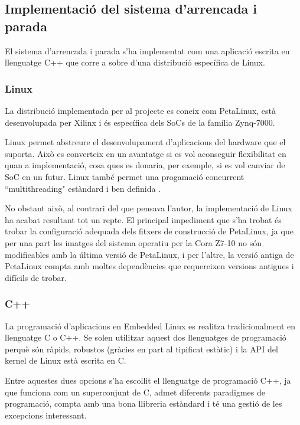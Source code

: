 \subsection{ Implementació del sistema d'arrencada i parada }
{ 
    El sistema d'arrencada i parada s'ha implementat com una aplicació escrita
    en llenguatge C++ que corre a sobre d'una distribució específica de Linux.

    \subsubsection{ Linux }
    { 
        La distribució implementada per al projecte es coneix com PetaLinux,
        està desenvolupada per Xilinx i és específica dels SoCs de la família
        Zynq-7000. 
        
        Linux permet abstreure el desenvolupament d'aplicacions del hardware
        que el suporta. Això es converteix en un avantatge si es vol aconseguir
        flexibilitat en quan a implementació, cosa ques es donaria, per
        exemple, si es vol canviar de SoC en un futur. Linux també permet una
        progamació concurrent ``multithreading" estàndard i ben definida \cite{cpp}.

        No obstant això, al contrari del que pensava l'autor, la implementació
        de Linux ha acabat resultant tot un repte. El principal impediment que
        s'ha trobat és trobar la configuració adequada dels fitxers de
        construcció de PetaLinux, ja que per una part les imatges del sistema
        operatiu per la Cora Z7-10 no són modificables amb la última versió de
        PetaLinux, i per l'altre, la versió antiga de PetaLinux compta amb
        moltes dependències que requereixen versions antigues i difícils de
        trobar.
    }

    \subsubsection{ C++ }
    { 
        La programació d'aplicacions en Embedded Linux es realitza
        tradicionalment en llenguatge C o C++. Se solen utilitzar aquest dos
        llenguatges de programació perquè són ràpids, robustos (gràcies en part
        al tipificat estàtic) i la API del kernel de Linux està escrita en C.
        
        Entre aquestes dues opcions s'ha escollit el llenguatge de programació
        C++, ja que funciona com un superconjunt de C, admet diferents
        paradigmes de programació, compta amb una bona llibreria estàndard i té
        una gestió de les excepcions interessant.

}}
